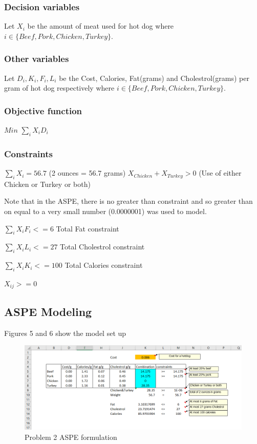 \documentclass[]{article}
\begin{document}
\subsubsection{Decision variables}\label{decision-variables-1}

Let \(X_{i}\) be the amount of meat used for hot dog where
\(i \in \{Beef,Pork, Chicken, Turkey\}\).

\subsubsection{Other variables}\label{other-variables-1}

Let \(D_{i},K_{i},F_{i},L_{i}\) be the Cost, Calories, Fat(grams) and
Cholestrol(grams) per gram of hot dog respectively where
\(i \in \{Beef,Pork, Chicken, Turkey\}\).

\subsubsection{Objective function}\label{objective-function-1}

\(Min\) \(\sum_{i}X_{i}D_{i}\)

\subsubsection{Constraints}\label{constraints-1}

\(\sum_{i}X_{i} = 56.7\) (2 ounces = 56.7 grams)
\(X_{Chicken} + X_{Turkey} > 0\) (Use of either Chicken or Turkey or
both)

Note that in the ASPE, there is no greater than constraint and so
greater than on equal to a very small number (0.0000001) was used to
model.

\(\sum_{i}X_{i}F_{i} <= 6\) Total Fat constraint

\(\sum_{i}X_{i}L_{i} <= 27\) Total Cholestrol constraint

\(\sum_{i}X_{i}K_{i} <= 100\) Total Calories constraint

\(X_{ij} > = 0\)

\subsection{ASPE Modeling}\label{aspe-modeling}

Figures 5 and 6 show the model set up

\begin{figure}
\centering
\includegraphics[height=0.50000\textwidth]{Figures/Homework3/p2.PNG}
\caption{Problem 2 ASPE formulation}
\end{figure}
\end{document}
